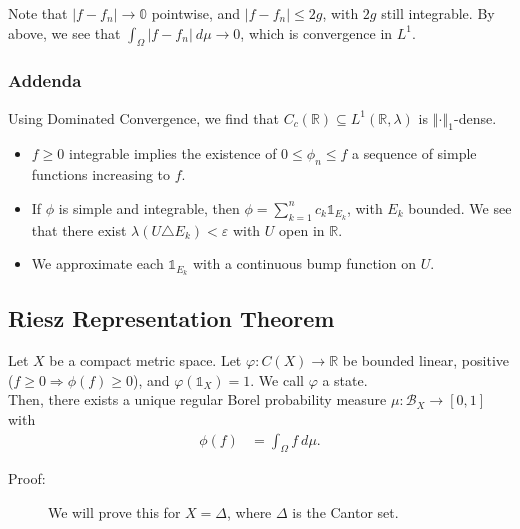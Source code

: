 \documentclass[9pt]{extarticle}
\newcommand{\R}{\mathbb{R}}
\newcommand{\norm}[1]{\left\Vert #1 \right\Vert}
\begin{document}
\begin{description}
      Note that $|f-f_n| \rightarrow \mathbb{0}$ pointwise, and $|f-f_n| \leq 2g$, with $2g$ still integrable. By above, we see that $\int_{\Omega}|f-f_n|~d\mu \rightarrow 0$, which is convergence in $L^1$.
  \end{description}
  \subsubsection{Addenda}%
  Using Dominated Convergence, we find that $C_{c}(\R)\subseteq L^{1}(\R,\lambda)$ is $\norm{\cdot}_1$-dense.
  \begin{itemize}
    \item $f\geq 0$ integrable implies the existence of $0\leq \phi_n\leq f$ a sequence of simple functions increasing to $f$.
    \item If $\phi$ is simple and integrable, then $\phi = \sum_{k=1}^{n}c_k\mathbb{1}_{E_k}$, with $E_k$ bounded. We see that there exist $\lambda(U\triangle E_k) < \varepsilon$ with $U$ open in $\R$.
    \item We approximate each $\mathbb{1}_{E_k}$ with a continuous bump function on $U$.
  \end{itemize}
  \subsection{Riesz Representation Theorem}%
  Let $X$ be a compact metric space. Let $\varphi: C(X)\rightarrow \R$ be bounded linear, positive ($f\geq 0\Rightarrow \phi(f) \geq 0$), and $\varphi\left(\mathbb{1}_X\right) = 1$. We call $\varphi$ a state.\\

  Then, there exists a unique regular Borel probability measure $\mu: \mathcal{B}_{X}\rightarrow [0,1]$ with
  \begin{align*}
    \phi(f) &= \int_{\Omega}f~d\mu.
  \end{align*}
  \begin{description}
    \item[Proof:] We will prove this for $X = \Delta$, where $\Delta$ is the Cantor set.
  \end{description}
\end{document}
